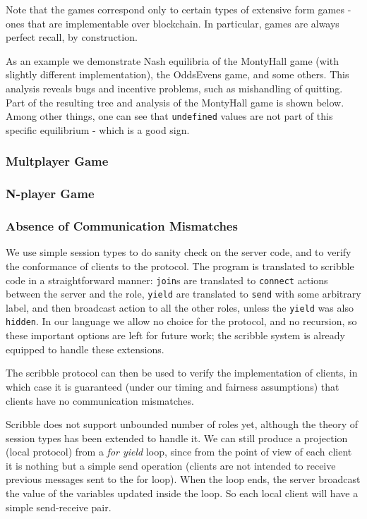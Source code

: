 \documentclass[acmsmall,review,anonymous]{acmart}\settopmatter{printfolios=true,printccs=false,printacmref=false}
\begin{document}
Note that the games correspond only to certain types of extensive form games - ones that are implementable over blockchain. In particular, games are always perfect recall, by construction.

As an example we demonstrate Nash equilibria of the MontyHall game (with slightly different implementation), the OddsEvens game, and some others. This analysis reveals bugs and incentive problems, such as mishandling of quitting. Part of the resulting tree and analysis of the MontyHall game is shown below. Among other things, one can see that \texttt{undefined} values are not part of this specific equilibrium - which is a good sign.

\subsubsection{Multplayer Game}

\subsubsection{N-player Game}


\subsubsection{Absence of Communication Mismatches}
We use simple session types to do sanity check on the server code, and to verify the conformance of clients to the protocol. The program is translated to scribble code in a straightforward manner: \texttt{join}s are translated to \texttt{connect} actions between the server and the role, \texttt{yield} are translated to \texttt{send} with some arbitrary label, and then broadcast action to all the other roles, unless the \texttt{yield} was also \texttt{hidden}. In our language we allow no choice for the protocol, and no recursion, so these important options are left for future work; the scribble system is already equipped to handle these extensions.

The scribble protocol can then be used to verify the implementation of clients, in which case it is guaranteed (under our timing and fairness assumptions) that clients have no communication mismatches.

Scribble does not support unbounded number of roles yet, although the theory of session types has been extended to handle it. We can still produce a projection (local protocol) from a \textit{for yield} loop, since from the point of view of each client it is nothing but a simple send operation (clients are not intended to receive previous messages sent to the for loop). When the loop ends, the server broadcast the value of the variables updated inside the loop. So each local client will have a simple send-receive pair.
\end{document}
